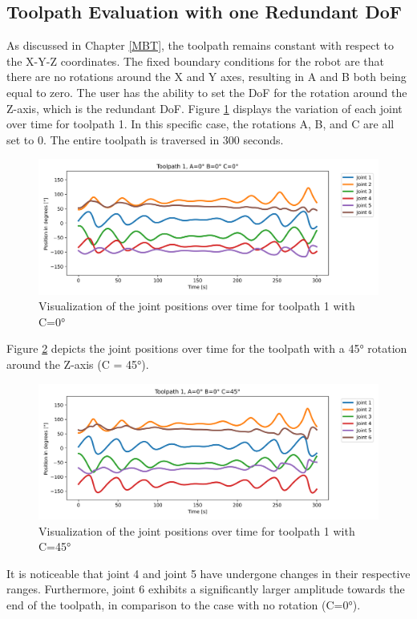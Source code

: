 \subsection{Toolpath Evaluation with one Redundant DoF}
As discussed in Chapter \ref{MBT}, the toolpath remains constant with respect to the X-Y-Z coordinates. The fixed boundary conditions for the robot are that there are no rotations around the X and Y axes, resulting in A and B both being equal to zero. The user has the ability to set the \acrshort{DoF} for the rotation around the Z-axis, which is the redundant \acrshort{DoF}. Figure \ref{TP1ABC0} displays the variation of each joint over time for toolpath 1. In this specific case, the rotations A, B, and C are all set to 0. The entire toolpath is traversed in 300 seconds.

\begin{figure}[H]
	\centerline{\includegraphics[width=1\textwidth]{figures/TP1ABC0.png}}
	\caption{Visualization of the joint positions over time for toolpath 1 with C=0°}
	\label{TP1ABC0}
\end{figure}

Figure \ref{TP1ABC45} depicts the joint positions over time for the toolpath with a 45° rotation around the Z-axis (C = 45°). 
\begin{figure}[H]
	\centerline{\includegraphics[width=1\textwidth]{figures/TP1ABC45.png}}
	\caption{Visualization of the joint positions over time for toolpath 1 with C=45°}
	\label{TP1ABC45}
\end{figure}
\newpage
It is noticeable that joint 4 and joint 5 have undergone changes in their respective ranges. Furthermore, joint 6 exhibits a significantly larger amplitude towards the end of the toolpath, in comparison to the case with no rotation (C=0°).

